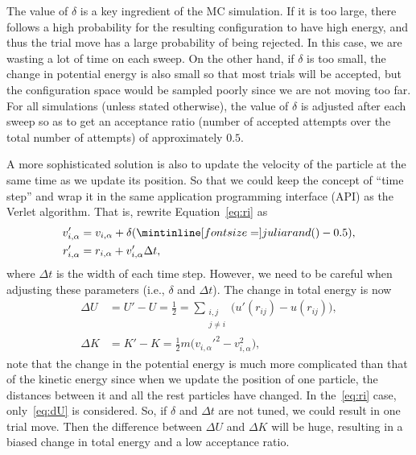 The value of \(\delta\) is a key
ingredient of the MC simulation. If it is too large, there follows a high probability
for the resulting configuration to have high energy, and thus the trial move has a
large probability of being rejected.
In this case, we are wasting a lot of time on each sweep.
On the other hand, if \(\delta\) is too small, the change in
potential energy is also small so that most trials will be accepted, but the configuration
space would be sampled poorly since we are not moving too far.
For all simulations (unless stated otherwise), the
value of \(\delta\) is adjusted after each sweep so as to get an acceptance ratio (number of
accepted attempts over the total number of attempts) of approximately \(0.5\).

A more sophisticated solution is also to update the velocity of the particle
at the same time as we update its position. So that we could keep the concept of
``time step'' and wrap it in the same application programming interface (API)
as the Verlet algorithm.
That is, rewrite Equation~\eqref{eq:ri} as
%
\begin{align}
    v_{i, \alpha}' & = v_{i, \alpha} + \delta (\code{rand()} - 0.5),\label{eq:vnew} \\
    r_{i, \alpha}' & = r_{i, \alpha} + v_{i, \alpha}' \Delta t,\label{eq:rnew}
\end{align}
%
where \(\Delta t\) is the width of each time step.
However, we need to be careful when adjusting these parameters (i.e., \(\delta\) and
\(\Delta t\)). The change in total energy is now
%
\begin{align}
    \Delta U & = U' - U = \frac{1}{2} = \sum_{\substack{i, j                            \\ j \neq i}} \bigl(u'(r_{ij}) - u(r_{ij})\bigr),\label{eq:dU} \\
    \Delta K & = K' - K = \frac{1}{2} m \bigl(v_{i, \alpha}'^2 - v_{i, \alpha}^2\bigr),
\end{align}
%
note that the change in the potential energy is much more complicated than that of the
kinetic energy since when we update the position of one particle, the distances
between it and all the rest particles have changed.
In the~\eqref{eq:ri} case, only~\eqref{eq:dU} is considered.
So, if \(\delta\) and \(\Delta t\) are not tuned, we could result in one trial move.
Then the difference between \(\Delta U\) and \(\Delta K\) will be huge, resulting in a
biased change in total energy and a low acceptance ratio.

